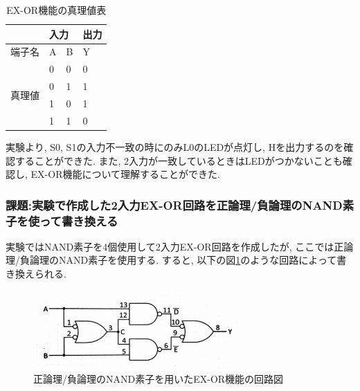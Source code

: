 \documentclass[a4paper, 11pt, uplatex]{jsarticle}
\begin{document}
\begin{table}[H]
  \begin{center}
  \caption{EX-OR機能の真理値表}
  \label{EX-OR真理値表}
\begin{tabular}{|l|l|l|l|}
\hline
                    & \multicolumn{2}{l|}{入力} & 出力 \\ \hline
端子名                 & A          & B          & Y  \\ \hline \hline
\multirow{4}{*}{真理値} & 0          & 0          & 0 \\
        　             & 0          & 1          & 1 \\
        　             & 1          & 0          & 1 \\
        　             & 1          & 1          & 0  \\ \hline
\end{tabular}
\end{center}
\end{table}

実験より, S0, S1の入力不一致の時にのみL0のLEDが点灯し, Hを出力するのを確認することができた.
また,  2入力が一致しているときはLEDがつかないことも確認し, EX-OR機能について理解することができた.

\subsubsection{課題:実験で作成した2入力EX-OR回路を正論理/負論理のNAND素子を使って書き換える}
実験ではNAND素子を4個使用して2入力EX-OR回路を作成したが,  ここでは正論理/負論理のNAND素子を使用する.
すると, 以下の図\ref{EX-OR書き換え}のような回路によって書き換えられる.
\begin{figure}[H]
  \begin{center}
    \includegraphics[width = 8cm]{画像/EX-OR書き換え.png}
    \caption{正論理/負論理のNAND素子を用いたEX-OR機能の回路図}
    \label{EX-OR書き換え}
  \end{center}
\end{figure}
\end{document}
